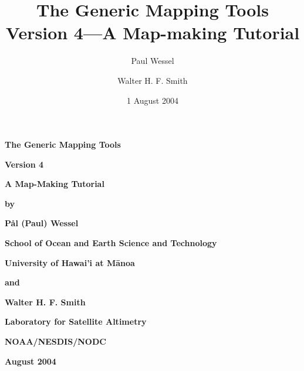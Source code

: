 \documentclass{report}
\title{The Generic Mapping Tools Version 4---A Map-making Tutorial}
\author{Paul Wessel \and Walter H. F. Smith}
\date{1 August 2004}
\begin{document}

\pagestyle{headings}

\thispagestyle{empty}

\begin{center}
\huge
\textbf{The Generic Mapping Tools}\par 
\vspace{0.5\baselineskip}


\Huge
\textbf{Version 4}\par 
\vspace{0.25\baselineskip}

\huge
\textbf{A Map-Making Tutorial}\par 

\large
\vspace{0.75\baselineskip}
\textbf{by}\par 
\vspace{0.75\baselineskip}

\huge
\textbf{P\aa l (Paul) Wessel}\par 
\vspace{0.5\baselineskip}

\Large
\textbf{School of Ocean and Earth Science and Technology}\par 
\textbf{University of Hawai'i at M\={a}noa}\par 

\large
\vspace{0.75\baselineskip}
\textbf{and}\par 
\vspace{0.75\baselineskip}

\huge
\textbf{Walter H. F. Smith}\par 
\vspace{0.5\baselineskip}

\Large
\textbf{Laboratory for Satellite Altimetry}\par 
\textbf{NOAA/NESDIS/NODC}\par 
\vspace{0.5\baselineskip}

\large
\textbf{August 2004}\par 
\vspace{\baselineskip}

\end{center}
\clearpage

\thispagestyle{headings}

\tableofcontents 
\thispagestyle{headings}
\end{document}
